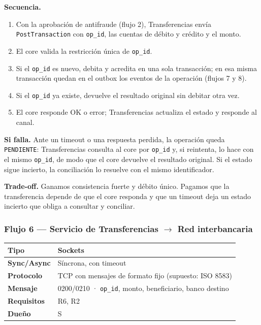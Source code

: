 \documentclass[11pt,a4paper]{article}
\begin{document}
\textbf{Secuencia.}
\begin{enumerate}
  \item Con la aprobación de antifraude (flujo 2), Transferencias envía \texttt{PostTransaction}
        con \texttt{op\_id}, las cuentas de débito y crédito y el monto.
  \item El core valida la restricción única de \texttt{op\_id}.
  \item Si el \texttt{op\_id} es nuevo, debita y acredita en una sola transacción; en esa misma
        transacción quedan en el outbox los eventos de la operación (flujos 7 y 8).
  \item Si el \texttt{op\_id} ya existe, devuelve el resultado original sin debitar otra vez.
  \item El core responde OK o error; Transferencias actualiza el estado y responde al canal.
\end{enumerate}

\textbf{Si falla.} Ante un timeout o una respuesta perdida, la operación queda
\texttt{PENDIENTE}: Transferencias consulta al core por \texttt{op\_id} y, si reintenta, lo hace
con el mismo \texttt{op\_id}, de modo que el core devuelve el resultado original. Si el estado
sigue incierto, la conciliación lo resuelve con el mismo identificador.

\textbf{Trade-off.} Ganamos consistencia fuerte y débito único. Pagamos que la transferencia
depende de que el core responda y que un timeout deja un estado incierto que obliga a consultar y
conciliar.

\subsubsection*{Flujo 6 --- Servicio de Transferencias $\rightarrow$ Red interbancaria}

\begin{tabular}{|l|p{9.5cm}|}
\hline
\textbf{Tipo} & Sockets \\ \hline
\textbf{Sync/Async} & Síncrona, con timeout \\ \hline
\textbf{Protocolo} & TCP con mensajes de formato fijo (supuesto: ISO 8583) \\ \hline
\textbf{Mensaje} & 0200/0210 · \texttt{op\_id}, monto, beneficiario, banco destino \\ \hline
\textbf{Requisitos} & R6, R2 \\ \hline
\textbf{Dueño} & S \\ \hline
\end{tabular}
\end{document}
